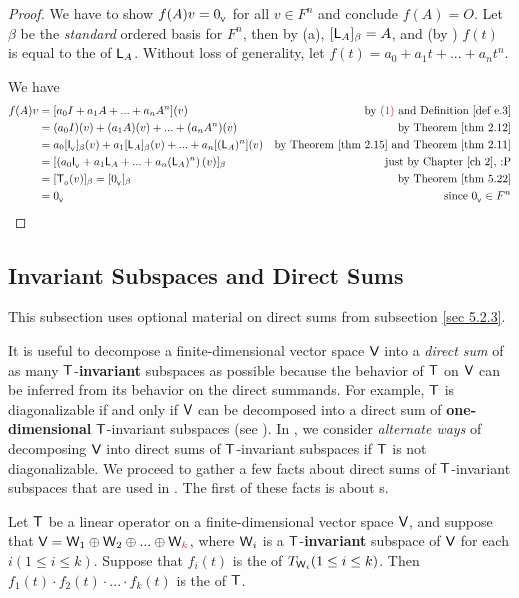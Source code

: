 \begin{proof}
We have to show \(f(A) v = 0_{_{\textsf{V}}}\) for all \(v \in F^n\) and conclude \(f(A) = O\).
Let \(\beta\) be the \emph{standard} ordered basis for \(F^n\), then by (a), \([\textsf{L}_A]_{\beta} = A\), and (by ) \(f(t)\) is equal to the \CPOLY{} of \(\textsf{L}_A\).
Without loss of generality, let \(f(t) = a_0 + a_1 t + ... + a_n t^n\). 

We have
\begin{align*}
    f(A) v & = [a_0 I + a_1 A + ... + a_n A^n](v) & \text{by \MAROON{(1)} and \DEF{e.3}} \\
           & = (a_0 I)(v) + (a_1 A)(v) + ... + (a_n A^n)(v) & \text{by \THM{2.12}} \\
           & = a_0 [\ITRANV{}]_{\beta} (v) + a_1 [\LMTRAN_A]_{\beta} (v) + ... + a_n [(\LMTRAN_A)^n] (v) & \text{by \THM{2.15} and \THM{2.11}} \\
           & = [\left( a_0 \ITRANV{} + a_1 \LMTRAN_A + ... + a_n (\LMTRAN_A)^n \right) (v)]_{\beta} & \text{just by \CH{2}, :P} \\
           & = [\TZERO(v)]_{\beta} = [\OV]_{\beta} & \text{by \THM{5.22}} \\
           & = \OV & \text{since \(\OV \in F^n\)}
\end{align*}
\end{proof}

\subsection{Invariant Subspaces and Direct Sums} \label{sec 5.4.2}
This subsection uses optional material on direct sums from subsection \ref{sec 5.2.3}.

It is useful to decompose a finite-dimensional vector space \(\textsf{V}\) into a \emph{direct sum} of as many \(\textsf{T}\)-\textbf{invariant} subspaces as possible because the behavior of \(\textsf{T}\) on \(\textsf{V}\) can be inferred from its behavior on the direct summands.
For example, \(\textsf{T}\) is diagonalizable if and only if \(\textsf{V}\) can be decomposed into a direct sum of \textbf{one-dimensional} \(\textsf{T}\)-invariant subspaces (see ).
In , we consider \emph{alternate ways} of decomposing \(\textsf{V}\) into direct sums of \(\textsf{T}\)-invariant subspaces if \(\textsf{T}\) is not diagonalizable.
We proceed to gather a few facts about direct sums of \(\textsf{T}\)-invariant subspaces that are used in .
The first of these facts is about \CPOLY{}s.

\begin{theorem} \label{thm 5.23}
Let \(\textsf{T}\) be a linear operator on a finite-dimensional vector space \(\textsf{V}\), and suppose that \(\V = \W_1 \oplus \W_2 \oplus ... \oplus \W_{\RED{k}}\), where \(\textsf{W}_i\) is a \(\textsf{T}\)-\textbf{invariant} subspace of \(\textsf{V}\) for each \(i (1 \le i \le k)\).
Suppose that \(f_i(t)\) is the \CPOLY{} of \(T_{\textsf{W}_i} (1 \le i \le k)\).
Then \(f_1(t) \cdot f_2(t) \cdot ... \cdot f_k(t)\) is the \CPOLY{} of \(\textsf{T}\).
\end{theorem}

